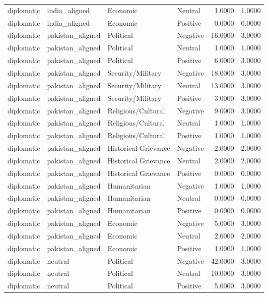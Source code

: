\begin{longtable}{llllrr}
diplomatic & india\_aligned & Economic & Neutral & 1.0000 & 1.0000 \\
diplomatic & india\_aligned & Economic & Positive & 0.0000 & 0.0000 \\
diplomatic & pakistan\_aligned & Political & Negative & 16.0000 & 3.0000 \\
diplomatic & pakistan\_aligned & Political & Neutral & 1.0000 & 1.0000 \\
diplomatic & pakistan\_aligned & Political & Positive & 6.0000 & 3.0000 \\
diplomatic & pakistan\_aligned & Security/Military & Negative & 18.0000 & 3.0000 \\
diplomatic & pakistan\_aligned & Security/Military & Neutral & 13.0000 & 3.0000 \\
diplomatic & pakistan\_aligned & Security/Military & Positive & 3.0000 & 3.0000 \\
diplomatic & pakistan\_aligned & Religious/Cultural & Negative & 9.0000 & 3.0000 \\
diplomatic & pakistan\_aligned & Religious/Cultural & Neutral & 1.0000 & 1.0000 \\
diplomatic & pakistan\_aligned & Religious/Cultural & Positive & 1.0000 & 1.0000 \\
diplomatic & pakistan\_aligned & Historical Grievance & Negative & 2.0000 & 2.0000 \\
diplomatic & pakistan\_aligned & Historical Grievance & Neutral & 2.0000 & 2.0000 \\
diplomatic & pakistan\_aligned & Historical Grievance & Positive & 0.0000 & 0.0000 \\
diplomatic & pakistan\_aligned & Humanitarian & Negative & 1.0000 & 1.0000 \\
diplomatic & pakistan\_aligned & Humanitarian & Neutral & 0.0000 & 0.0000 \\
diplomatic & pakistan\_aligned & Humanitarian & Positive & 0.0000 & 0.0000 \\
diplomatic & pakistan\_aligned & Economic & Negative & 5.0000 & 3.0000 \\
diplomatic & pakistan\_aligned & Economic & Neutral & 2.0000 & 2.0000 \\
diplomatic & pakistan\_aligned & Economic & Positive & 1.0000 & 1.0000 \\
diplomatic & neutral & Political & Negative & 42.0000 & 3.0000 \\
diplomatic & neutral & Political & Neutral & 10.0000 & 3.0000 \\
diplomatic & neutral & Political & Positive & 5.0000 & 3.0000 \\

\end{longtable}
